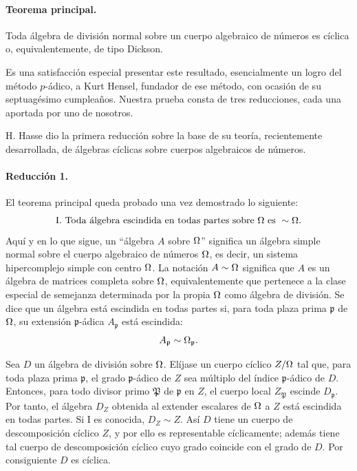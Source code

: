 \paragraph{Teorema principal.}
Toda álgebra de división normal sobre un cuerpo algebraico de números es cíclica o, equivalentemente, de tipo Dickson.

Es una satisfacción especial presentar este resultado, esencialmente un logro del método \(p\)-ádico, a Kurt Hensel, fundador de ese método, con ocasión de su septuagésimo cumpleaños. Nuestra prueba consta de tres reducciones, cada una aportada por uno de nosotros.

H. Hasse dio la primera reducción sobre la base de su teoría, recientemente desarrollada, de álgebras cíclicas sobre cuerpos algebraicos de números.

\paragraph{Reducción 1.}
El teorema principal queda probado una vez demostrado lo siguiente:
\[
\text{I. Toda álgebra escindida en todas partes sobre }\Omega\text{ es } \sim\Omega .
\]
Aquí y en lo que sigue, un ``álgebra \(A\) sobre \(\Omega\)'' significa un álgebra simple normal sobre el cuerpo algebraico de números \(\Omega\), es decir, un sistema hipercomplejo simple con centro \(\Omega\). La notación \(A\sim\Omega\) significa que \(A\) es un álgebra de matrices completa sobre \(\Omega\), equivalentemente que pertenece a la clase especial de semejanza determinada por la propia \(\Omega\) como álgebra de división. Se dice que un álgebra está escindida en todas partes si, para toda plaza prima \(\mathfrak p\) de \(\Omega\), su extensión \(\mathfrak p\)-ádica \(A_{\mathfrak p}\) está escindida:
\[
        A_{\mathfrak p}\sim\Omega_{\mathfrak p}.
\]

Sea \(D\) un álgebra de división sobre \(\Omega\). Elíjase un cuerpo cíclico \(Z/\Omega\) tal que, para toda plaza prima \(\mathfrak p\), el grado \(\mathfrak p\)-ádico de \(Z\) sea múltiplo del índice \(\mathfrak p\)-ádico de \(D\). Entonces, para todo divisor primo \(\mathfrak P\) de \(\mathfrak p\) en \(Z\), el cuerpo local \(Z_{\mathfrak P}\) escinde \(D_{\mathfrak p}\). Por tanto, el álgebra \(D_Z\) obtenida al extender escalares de \(\Omega\) a \(Z\) está escindida en todas partes. Si I es conocida, \(D_Z\sim Z\). Así \(D\) tiene un cuerpo de descomposición cíclico \(Z\), y por ello es representable cíclicamente; además tiene tal cuerpo de descomposición cíclico cuyo grado coincide con el grado de \(D\). Por consiguiente \(D\) es cíclica.

